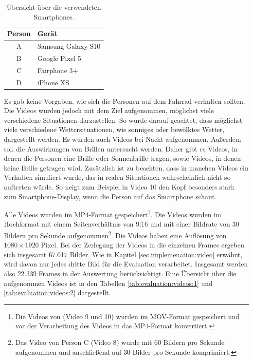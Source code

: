 \begin{table}[]
\begin{tabular}{c l}
\toprule
\textbf{Person} & \textbf{Gerät} \\ \midrule
A      & Samsung Galaxy S10 \\
B      & Google Pixel 5     \\
C      & Fairphone 3+       \\
D      & iPhone XS     \\ \bottomrule    
\end{tabular}
\caption{Übersicht über die verwendeten Smartphones.}
\label{tab:evaluation:devices}
\end{table}

Es gab keine Vorgaben, wie sich die Personen auf dem Fahrrad verhalten sollten. Die Videos wurden jedoch mit dem Ziel aufgenommen, möglichst viele verschiedene Situationen darzustellen. So wurde darauf geachtet, dass möglichst viele verschiedene Wettersituationen, wie sonniges oder bewölktes Wetter, dargestellt werden. Es wurden auch Videos bei Nacht aufgenommen. Außerdem soll die Auswirkungen von Brillen untersucht werden. Daher gibt es Videos, in denen die Personen eine Brille oder Sonnenbrille tragen, sowie Videos, in denen keine Brille getragen wird. Zusätzlich ist zu beachten, dass in manchen Videos ein Verhalten simuliert wurde, das in realen Situationen wahrscheinlich nicht so auftreten würde. So neigt zum Beispiel \philipp in Video 10 den Kopf besonders stark zum Smartphone-Display, wenn die Person auf das Smartphone schaut.

Alle Videos wurden im MP4-Format gespeichert\footnote{Die Videos von \philipp (Video 9 und 10) wurden im MOV-Format gespeichert und vor der Verarbeitung des Videos in das MP4-Format konvertiert.}. Die Videos wurden im Hochformat mit einem Seitenverhältnis von 9:16 und mit einer Bildrate von 30 Bildern pro Sekunde aufgenommen\footnote{Das Video von Person C (Video 8) wurde mit 60 Bildern pro Sekunde aufgenommen und anschließend auf 30 Bilder pro Sekunde komprimiert.}. Die Videos haben eine Auflösung von $1080 \times 1920$ Pixel. Bei der Zerlegung der Videos in die einzelnen Frames ergeben sich insgesamt 67.017 Bilder. Wie in Kapitel \ref{sec:implemenation:video} erwähnt, wird davon nur jedes dritte Bild für die Evaluation verarbeitet. Insgesamt werden also 22.339 Frames in der Auswertung berücksichtigt. Eine Übersicht über die aufgenommen Videos ist in den Tabellen \ref{tab:evaluation:videos:1} und \ref{tab:evaluation:videos:2} dargestellt.

